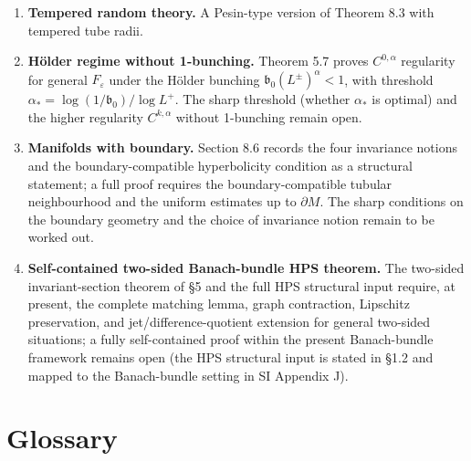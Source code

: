 \documentclass[11pt,a4paper]{article}
\theoremstyle{plain}
\theoremstyle{definition}
\theoremstyle{remark}
\numberwithin{equation}{section}
\numberwithin{figure}{section}
\begin{document}
\begin{enumerate}
    \item \textbf{Tempered random theory.} A Pesin-type version of Theorem 8.3 with tempered tube radii.

    \item \textbf{Hölder regime without 1-bunching.} Theorem 5.7 proves $C^{0,\alpha}$ regularity for general $F_\varepsilon$ under the Hölder bunching $\mathfrak b_0(L^\pm)^\alpha<1$, with threshold $\alpha_*=\log(1/\mathfrak b_0)/\log L^+$. The sharp threshold (whether $\alpha_*$ is optimal) and the higher regularity $C^{k,\alpha}$ without 1-bunching remain open.

    \item \textbf{Manifolds with boundary.} Section 8.6 records the four invariance notions and the boundary-compatible hyperbolicity condition as a structural statement; a full proof requires the boundary-compatible tubular neighbourhood and the uniform estimates up to \(\partial M\). The sharp conditions on the boundary geometry and the choice of invariance notion remain to be worked out.

    \item \textbf{Self-contained two-sided Banach-bundle HPS theorem.} The two-sided invariant-section theorem of §5 and the full HPS structural input require, at present, the complete matching lemma, graph contraction, Lipschitz preservation, and jet/difference-quotient extension for general two-sided situations; a fully self-contained proof within the present Banach-bundle framework remains open (the HPS structural input is stated in §1.2 and mapped to the Banach-bundle setting in SI Appendix J).
\end{enumerate}

\section*{Glossary}
\end{document}
